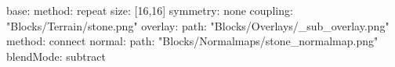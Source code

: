 base:
  method: repeat
  size: [16,16]
  symmetry: none
  coupling: "Blocks/Terrain/stone.png"
overlay:
  path: "Blocks/Overlays/_sub_overlay.png"
  method: connect
normal:
  path: "Blocks/Normalmaps/stone_normalmap.png"
blendMode: subtract
